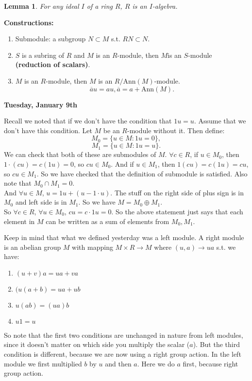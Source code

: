 \documentclass[9pt,reqno,twoside]{amsbook}
\theoremstyle{plain}
\numberwithin{section}{chapter}
\numberwithin{equation}{chapter}
\newtheorem{lem}[theorem]{Lemma}
\theoremstyle{definition}
\theoremstyle{remark}
\theoremstyle{plain}
\renewcommand{\bar}{\overline}%
\begin{document}
\begin{lem}
For any ideal $I$ of a ring $R$, $R$ is an $I$-algebra. 
\end{lem}

\textbf{Constructions:}
\begin{enumerate}
\item Submodule: a subgroup $N \subset M$ s.t. $RN \subset N$. 
\item $S$ is a subring of $R$ and $M$ is an $R$-module, then $M$is an $S$-module \textbf{(reduction of scalars)}. 
\item $M$ is an $R$-module, then $M$ is an $R/\text{Ann}(M)$-module. 
$$
\bar{a}u = au, \bar{a} = a + \text{Ann}(M).
$$
\end{enumerate}

\textbf{Tuesday, January 9th}

Recall we noted that if we don't have the condition that $1u = u$. Assume that we don't have this condition. Let $M$ be an $R$-module without it. Then define:
$$
M_0 = \{u \in M: 1u = 0\},
$$
$$
M_1 = \{u \in M: 1u = u\}.
$$
We can check that both of these are submodules of $M$. $\forall c \in R$, if $u \in M_0$, then $1\cdot(cu) = c(1u) = 0$, so $cu \in M_0$.  And if $u \in M_1$, then $1(cu) = c(1u) = cu$, so $cu \in M_1$. So we have checked that the definition of submodule is satisfied. Also note that $M_0 \cap M_1 = 0$. \\
And $\forall u \in M$, $u = 1u + (u - 1\cdot u)$. The stuff on the right side of plus sign is in $M_0$ and left side is in $M_1$. So we have $M = M_0\oplus M_1$. \\
So $\forall c \in R$, $\forall u \in M_0$, $cu = c\cdot1u = 0$. So the above statement just says that each element in $M$ can be written as a sum of elements from $M_0,M_1$. 

Keep in mind that what we defined yesterday was a left module. A right module is an abelian group $M$ with mapping $M \times R \to M$ where $(u,a) \to ua$ s.t. we have:
\begin{enumerate}
\item $(u + v)a = ua + va$
\item $(u(a + b) = ua + ub$
\item $u(ab) = (ua)b$
\item $u1 = u$
\end{enumerate} 
So note that the first two conditions are unchanged in nature from left modules, since it doesn't matter on which side you multiply the scalar ($a$). But the third condition is different, because we are now using a right group action. In the left module we first multiplied $b$ by $u$ and then $a$. Here we do $a$ first, because right group action. 
\end{document}
